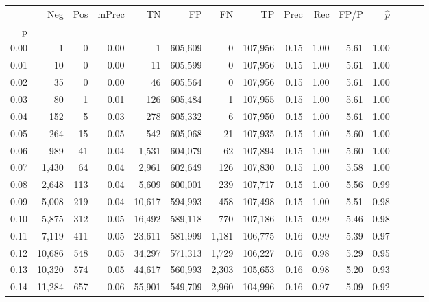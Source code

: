 \begin{tabular}{rrrrrrrrrrrrrrr}
\toprule
{} &     Neg &    Pos & mPrec &       TN &       FP &       FN &       TP &  Prec &   Rec &  FP/P & $\hat{p}$ \\
p    &         &        &       &          &          &          &          &       &       &       &           \\
\midrule
0.00 &       1 &      0 &  0.00 &        1 &  605,609 &        0 &  107,956 &  0.15 &  1.00 &  5.61 &      1.00 \\
0.01 &      10 &      0 &  0.00 &       11 &  605,599 &        0 &  107,956 &  0.15 &  1.00 &  5.61 &      1.00 \\
0.02 &      35 &      0 &  0.00 &       46 &  605,564 &        0 &  107,956 &  0.15 &  1.00 &  5.61 &      1.00 \\
0.03 &      80 &      1 &  0.01 &      126 &  605,484 &        1 &  107,955 &  0.15 &  1.00 &  5.61 &      1.00 \\
0.04 &     152 &      5 &  0.03 &      278 &  605,332 &        6 &  107,950 &  0.15 &  1.00 &  5.61 &      1.00 \\
0.05 &     264 &     15 &  0.05 &      542 &  605,068 &       21 &  107,935 &  0.15 &  1.00 &  5.60 &      1.00 \\
0.06 &     989 &     41 &  0.04 &    1,531 &  604,079 &       62 &  107,894 &  0.15 &  1.00 &  5.60 &      1.00 \\
0.07 &   1,430 &     64 &  0.04 &    2,961 &  602,649 &      126 &  107,830 &  0.15 &  1.00 &  5.58 &      1.00 \\
0.08 &   2,648 &    113 &  0.04 &    5,609 &  600,001 &      239 &  107,717 &  0.15 &  1.00 &  5.56 &      0.99 \\
0.09 &   5,008 &    219 &  0.04 &   10,617 &  594,993 &      458 &  107,498 &  0.15 &  1.00 &  5.51 &      0.98 \\
0.10 &   5,875 &    312 &  0.05 &   16,492 &  589,118 &      770 &  107,186 &  0.15 &  0.99 &  5.46 &      0.98 \\
0.11 &   7,119 &    411 &  0.05 &   23,611 &  581,999 &    1,181 &  106,775 &  0.16 &  0.99 &  5.39 &      0.97 \\
0.12 &  10,686 &    548 &  0.05 &   34,297 &  571,313 &    1,729 &  106,227 &  0.16 &  0.98 &  5.29 &      0.95 \\
0.13 &  10,320 &    574 &  0.05 &   44,617 &  560,993 &    2,303 &  105,653 &  0.16 &  0.98 &  5.20 &      0.93 \\
0.14 &  11,284 &    657 &  0.06 &   55,901 &  549,709 &    2,960 &  104,996 &  0.16 &  0.97 &  5.09 &      0.92 \\

\end{tabular}
